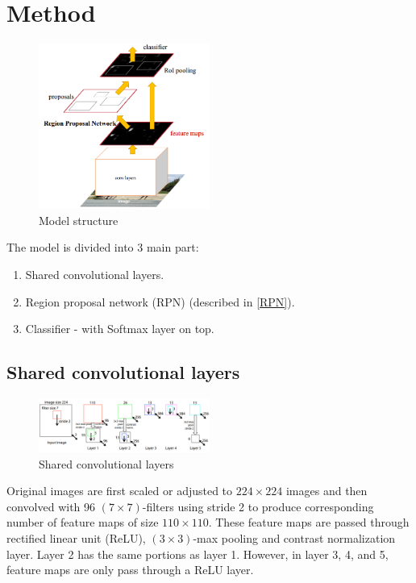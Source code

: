 \documentclass[conference]{IEEEtran}
\begin{document}
\section{Method}
\begin{figure}[h]
	\centering
	\includegraphics[width = 0.5\textwidth]{ModelStructure}
	\caption{Model structure \cite{slidingwin5}}
\end{figure}
The model is divided into 3 main part:
\begin{enumerate}
	\item Shared convolutional layers.
	\item Region proposal network (RPN) (described in \ref{RPN}).
	\item Classifier - with Softmax layer on top.
\end{enumerate}

\subsection{Shared convolutional layers}
\begin{figure}[h]
	\centering
	\includegraphics[width = 0.5\textwidth]{sharedconv}
	\caption{Shared convolutional layers \cite{ZF}}
\end{figure}
Original images are first scaled or adjusted to $224 \times 224$ images and then convolved with 96 $(7 \times 7)$-filters using stride 2 to produce corresponding number of feature maps of size $110 \times 110$. These feature maps are passed through rectified linear unit (ReLU), $(3 \times 3)$-max pooling and contrast normalization layer. Layer 2 has the same portions as layer 1. However, in layer 3, 4, and 5, feature maps are only pass through a ReLU layer.
\end{document}

